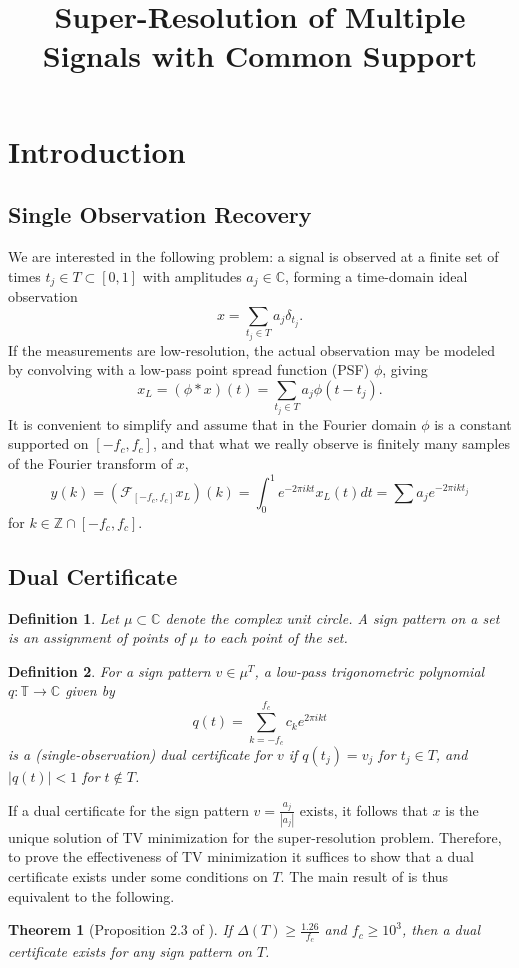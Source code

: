 \documentclass[11pt]{article}
\title{Super-Resolution of Multiple Signals with Common Support}
\newcommand{\TT}{\mathbb{T}}
\newcommand{\ZZ}{\mathbb{Z}}
\newcommand{\CC}{\mathbb{C}}
\newcommand{\sF}{\mathcal{F}}
\newtheorem{theorem}{Theorem}
\newtheorem{definition}{Definition}
\begin{document}
\maketitle

\noindent

\section{Introduction}

\subsection{Single Observation Recovery}

We are interested in the following problem: a signal is observed at a finite set of times $t_j \in T \subset [0, 1]$ with amplitudes $a_j \in \CC$, forming a time-domain ideal observation
\[ x = \sum_{t_j \in T} a_j\delta_{t_j}. \]
If the measurements are low-resolution, the actual observation may be modeled by convolving with a low-pass point spread function (PSF) $\phi$, giving
\[ x_L = (\phi * x)(t) = \sum_{t_j \in T} a_j \phi(t - t_j). \]
It is convenient to simplify and assume that in the Fourier domain $\phi$ is a constant supported on $[-f_c, f_c]$, and that what we really observe is finitely many samples of the Fourier transform of $x$,
\[ y(k) = (\sF_{[-f_c, f_c]} x_L)(k) = \int_0^1 e^{-2\pi i k t} x_L(t) dt = \sum a_j e^{-2\pi i k t_j} \]
for $k \in \ZZ \cap [-f_c, f_c]$.

\subsection{Dual Certificate}

\begin{definition}
    Let $\mu \subset \CC$ denote the complex unit circle.
    A \emph{sign pattern} on a set is an assignment of points of $\mu$ to each point of the set.
\end{definition}

\begin{definition}
    For a sign pattern $v \in \mu^T$, a low-pass trigonometric polynomial $q: \TT \to \CC$ given by
    \[ q(t) = \sum_{k = -f_c}^{f_c} c_k e^{2\pi i k t} \]
    is a \emph{(single-observation) dual certificate} for $v$ if $q(t_j) = v_j$ for $t_j \in T$, and $|q(t)| < 1$ for $t \notin T$.
\end{definition}
If a dual certificate for the sign pattern $v = \frac{a_j}{|a_j|}$ exists, it follows that $x$ is the unique solution of TV minimization for the super-resolution problem.
Therefore, to prove the effectiveness of TV minimization it suffices to show that a dual certificate exists under some conditions on $T$.
The main result of \cite{fernandez2016super} is thus equivalent to the following.
\begin{theorem}[Proposition 2.3 of \cite{fernandez2016super}]
    If $\Delta(T) \geq \frac{1.26}{f_c}$ and $f_c \geq 10^3$, then a dual certificate exists for any sign pattern on $T$.
    \label{thm:single-obs-recovery}
\end{theorem}
\end{document}
